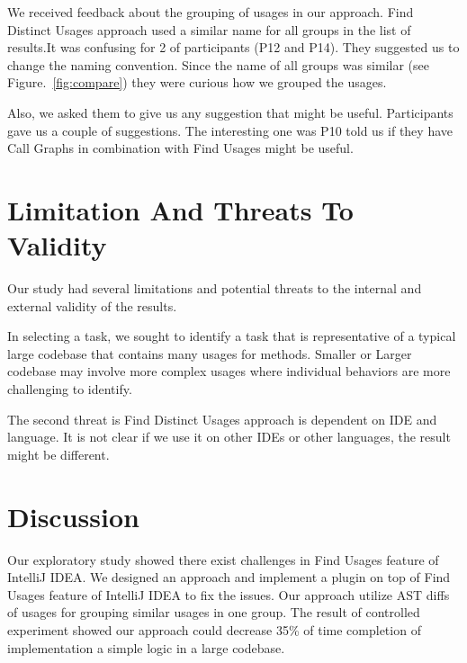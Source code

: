 \documentclass[conference]{IEEEtran}
\begin{document}
We received feedback about the grouping of usages in our approach. Find Distinct Usages approach used a similar name for all groups in the list of results.It was confusing for 2 of participants (P12 and P14). They suggested us to change the naming convention. Since the name of all groups was similar (see Figure.~\ref{fig:compare}) they were curious how we grouped the usages.\par

Also, we asked them to give us any suggestion that might be useful. Participants gave us a couple of suggestions. The interesting one was P10 told us if they have Call Graphs in combination with Find Usages might be useful. 



\section{Limitation And Threats To Validity}
Our study had several limitations and potential threats to the internal and external validity of the results. \par  

In selecting a task, we sought to identify a task that is representative of a typical large codebase that contains many usages for methods. Smaller or Larger codebase may involve more complex usages where individual behaviors are more challenging to identify. \par 

The second threat is Find Distinct Usages approach is dependent on IDE and language. It is not clear if we use it on other IDEs or other languages, the result might be different.\par 

\section{Discussion}
Our exploratory study showed there exist challenges in Find Usages feature of IntelliJ IDEA. We designed an approach and implement a plugin on top of Find Usages feature of IntelliJ IDEA to fix the issues. Our approach utilize AST diffs of usages for grouping similar usages in one group. The result of controlled experiment showed our approach could decrease 35\% of time completion of implementation a simple logic in a large codebase.
\end{document}
